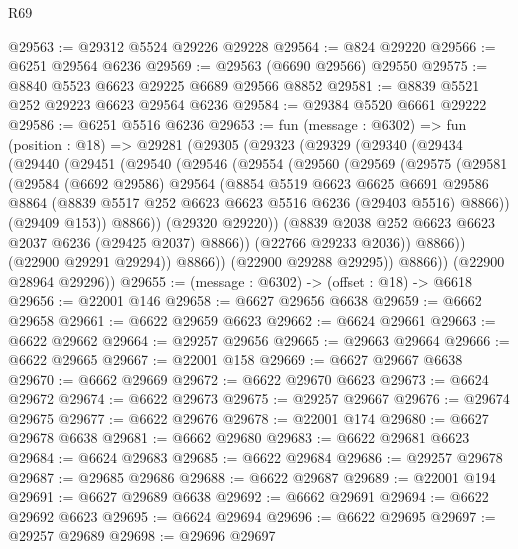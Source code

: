 \begin{lexlean}{R69}
\begin{coremodule}
{@29563 := @29312 @5524 @29226 @29228
@29564 := @824 @29220
@29566 := @6251 @29564 @6236
@29569 := @29563 (@6690 @29566) @29550
@29575 := @8840 @5523 @6623 @29225 @6689 @29566 @8852
@29581 := @8839 @5521 @252 @29223 @6623 @29564 @6236
@29584 := @29384 @5520 @6661 @29222
@29586 := @6251 @5516 @6236
@29653 := fun (message : @6302) =>
  fun (position : @18) =>
  @29281
    (@29305
      (@29323
        (@29329
          (@29340
            (@29434
              (@29440
                (@29451
                  (@29540
                    (@29546
                      (@29554
                        (@29560
                          (@29569
                            (@29575
                              (@29581
                                (@29584
                                  (@6692 @29586)
                                  @29564
                                  (@8854
                                    @5519
                                    @6623
                                    @6625
                                    @6691
                                    @29586
                                    @8864
                                    (@8839 @5517 @252 @6623 @6623 @5516 @6236 (@29403 @5516) @8866))
                                  (@29409 @153))
                                @8866))
                            (@29320 @29220))
                          (@8839 @2038 @252 @6623 @6623 @2037 @6236 (@29425 @2037) @8866))
                        (@22766 @29233 @2036))
                      @8866))
                  (@22900 @29291 @29294))
                @8866))
            (@22900 @29288 @29295))
          @8866))
      (@22900 @28964 @29296))
@29655 := (message : @6302) -> (offset : @18) -> @6618
@29656 := @22001 @146
@29658 := @6627 @29656 @6638
@29659 := @6662 @29658
@29661 := @6622 @29659 @6623
@29662 := @6624 @29661
@29663 := @6622 @29662
@29664 := @29257 @29656
@29665 := @29663 @29664
@29666 := @6622 @29665
@29667 := @22001 @158
@29669 := @6627 @29667 @6638
@29670 := @6662 @29669
@29672 := @6622 @29670 @6623
@29673 := @6624 @29672
@29674 := @6622 @29673
@29675 := @29257 @29667
@29676 := @29674 @29675
@29677 := @6622 @29676
@29678 := @22001 @174
@29680 := @6627 @29678 @6638
@29681 := @6662 @29680
@29683 := @6622 @29681 @6623
@29684 := @6624 @29683
@29685 := @6622 @29684
@29686 := @29257 @29678
@29687 := @29685 @29686
@29688 := @6622 @29687
@29689 := @22001 @194
@29691 := @6627 @29689 @6638
@29692 := @6662 @29691
@29694 := @6622 @29692 @6623
@29695 := @6624 @29694
@29696 := @6622 @29695
@29697 := @29257 @29689
@29698 := @29696 @29697
}
\end{coremodule}
\end{lexlean}
